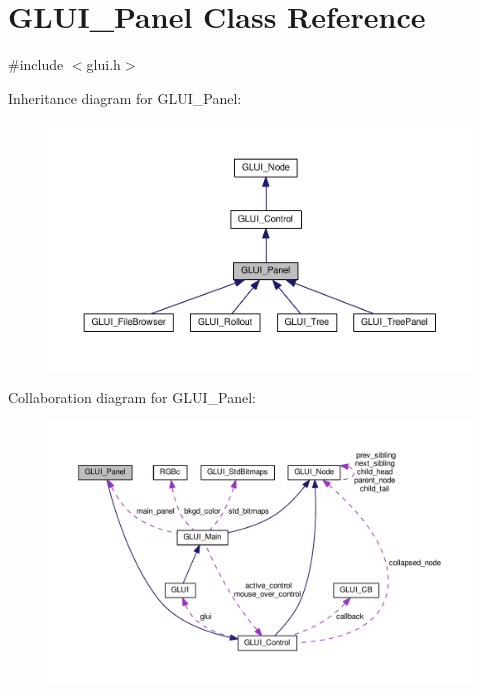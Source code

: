 \hypertarget{class_g_l_u_i___panel}{\section{G\+L\+U\+I\+\_\+\+Panel Class Reference}
\label{class_g_l_u_i___panel}
}


{\ttfamily \#include $<$glui.\+h$>$}



Inheritance diagram for G\+L\+U\+I\+\_\+\+Panel\+:\nopagebreak
\begin{figure}[H]
\begin{center}
\leavevmode
\includegraphics[width=350pt]{class_g_l_u_i___panel__inherit__graph}
\end{center}
\end{figure}


Collaboration diagram for G\+L\+U\+I\+\_\+\+Panel\+:\nopagebreak
\begin{figure}[H]
\begin{center}
\leavevmode
\includegraphics[width=350pt]{class_g_l_u_i___panel__coll__graph}
\end{center}
\end{figure}
